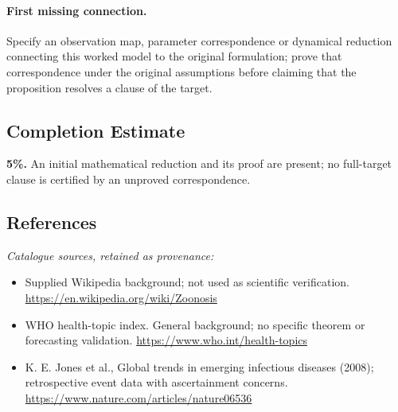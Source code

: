 \documentclass[11pt]{article}
\begin{document}
\paragraph{First missing connection.} Specify an observation map, parameter correspondence or dynamical reduction connecting this worked model to the original formulation; prove that correspondence under the original assumptions before claiming that the proposition resolves a clause of the target.
\subsection{Completion Estimate}
\textbf{5\%.} An initial mathematical reduction and its proof are present; no full-target clause is certified by an unproved correspondence.
\subsection{References}
\noindent\emph{Catalogue sources, retained as provenance:}
\begin{itemize}
\item Supplied Wikipedia background; not used as scientific verification. \url{https://en.wikipedia.org/wiki/Zoonosis}
\item WHO health-topic index. General background; no specific theorem or forecasting validation. \url{https://www.who.int/health-topics}
\item K. E. Jones et al., Global trends in emerging infectious diseases (2008); retrospective event data with ascertainment concerns. \url{https://www.nature.com/articles/nature06536}
\end{itemize}
\end{document}
